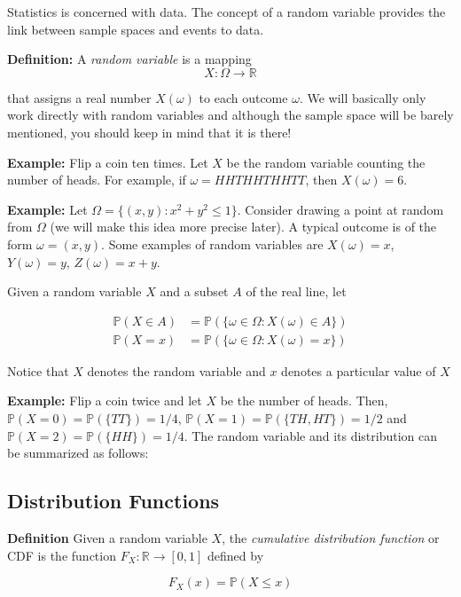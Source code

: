 \documentclass[
]{book}
\theoremstyle{definition}
\theoremstyle{definition}
\theoremstyle{definition}
\theoremstyle{definition}
\theoremstyle{remark}
\begin{document}
Statistics is concerned with data. The concept of a random variable provides the link between sample spaces and events to data.

\textbf{Definition:} A \emph{random variable} is a mapping
\[
X: \Omega \rightarrow \mathbb{R}
\]

that assigns a real number \(X(\omega)\) to each outcome \(\omega\). We will basically only work directly with random variables and although the sample space will be barely mentioned, you should keep in mind that it is there!

\textbf{Example:} Flip a coin ten times. Let \(X\) be the random variable counting the number of heads. For example, if \(\omega= HHTHHTHHTT\), then \(X(\omega)=6\).

\textbf{Example:} Let \(\Omega=\{(x,y): x^2+y^2 \leq 1\}\). Consider drawing a point at random from \(\Omega\) (we will make this idea more precise later). A typical outcome is of the form \(\omega=(x,y)\). Some examples of random variables are \(X(\omega)=x\), \(Y(\omega)=y\), \(Z(\omega)=x+y\).

Given a random variable \(X\) and a subset \(A\) of the real line, let

\begin{align}
\mathbb{P}(X\in A) &= \mathbb{P}(\{\omega\in\Omega: X(\omega)\in A\})\\
\mathbb{P}(X = x) &= \mathbb{P}(\{\omega\in\Omega: X(\omega)=x\})
\end{align}

Notice that \(X\) denotes the random variable and \(x\) denotes a particular value of \(X\)

\textbf{Example:} Flip a coin twice and let \(X\) be the number of heads. Then, \(\mathbb{P}(X=0)=\mathbb{P}(\{TT\})=1/4\), \(\mathbb{P}(X=1)=\mathbb{P}(\{TH,HT\})=1/2\) and \(\mathbb{P}(X=2)=\mathbb{P}(\{HH\})=1/4\). The random variable and its distribution can be summarized as follows:

\hypertarget{distribution-functions}{%
\subsection{Distribution Functions}\label{distribution-functions}}

\textbf{Definition} Given a random variable \(X\), the \emph{cumulative distribution function} or CDF is the function \(F_X:\mathbb{R}\rightarrow [0,1]\) defined by

\[
F_X(x)=\mathbb{P}(X\leq x)
\]
\end{document}

